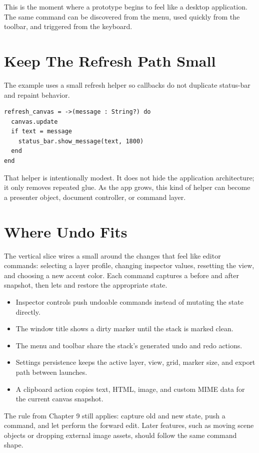 This is the moment where a prototype begins to feel like a desktop application. The same command can be discovered from the menu, used quickly from the toolbar, and triggered from the keyboard.

\section{Keep The Refresh Path Small}

The example uses a small refresh helper so callbacks do not duplicate status-bar and repaint behavior.

\begin{lstlisting}[style=crystal]
refresh_canvas = ->(message : String?) do
  canvas.update
  if text = message
    status_bar.show_message(text, 1800)
  end
end
\end{lstlisting}

That helper is intentionally modest. It does not hide the application architecture; it only removes repeated glue. As the app grows, this kind of helper can become a presenter object, document controller, or command layer.

\section{Where Undo Fits}

The vertical slice wires a small  around the changes that feel like editor commands: selecting a layer profile, changing inspector values, resetting the view, and choosing a new accent color. Each command captures a before and after snapshot, then lets  and  restore the appropriate state.

\begin{itemize}
\item Inspector controls push undoable commands instead of mutating the state directly.
\item The window title shows a dirty marker until the stack is marked clean.
\item The menu and toolbar share the stack's generated undo and redo actions.
\item Settings persistence keeps the active layer, view, grid, marker size, and export path between launches.
\item A clipboard action copies text, HTML, image, and custom MIME data for the current canvas snapshot.
\end{itemize}

The rule from Chapter 9 still applies: capture old and new state, push a command, and let  perform the forward edit. Later features, such as moving scene objects or dropping external image assets, should follow the same command shape.

